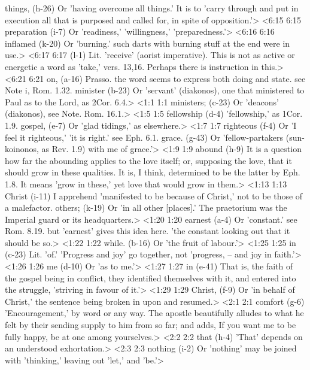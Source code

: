   things, (h-26)  Or 'having overcome all things.' It is to 'carry through and  put in execution all that is purposed and called for, in spite  of opposition.'>
<6:15 6:15  preparation (i-7)  Or 'readiness,' 'willingness,' 'preparedness.'>
<6:16 6:16  inflamed (k-20)  Or 'burning.' such darts with burning stuff at the end were  in use.>
<6:17 6:17   (l-1)  Lit. 'receive' (aorist imperative). This is not as active or  energetic a word as 'take,' vers. 13,16. Perhaps there is  instruction in this.>
<6:21 6:21  on, (a-16)  Prasso. the word seems to express both doing and state. see  Note i, Rom. 1.32.
  minister (b-23)  Or 'servant' (diakonos), one that ministered to Paul as to  the Lord, as 2Cor. 6.4.>
<1:1 1:1  ministers; (c-23)  Or 'deacons' (diakonos), see Note. Rom. 16.1.>
<1:5 1:5  fellowship (d-4)  'fellowship,' as 1Cor. 1.9.
  gospel, (e-7)  Or 'glad tidings,' as elsewhere.>
<1:7 1:7  righteous (f-4)  Or 'I feel it righteous,' 'it is right.' see Eph. 6.1.
  grace. (g-43)  Or 'fellow-partakers (sun-koinonos, as Rev. 1.9) with me of  grace.'>
<1:9 1:9  abound (h-9)  It is a question how far the abounding applies to the love  itself; or, supposing the love, that it should grow in these  qualities. It is, I think, determined to be the latter by Eph. 1.8. It means 'grow in these,' yet love that would grow in  them.>
<1:13 1:13  Christ (i-11)  I apprehend 'manifested to be because of Christ,' not to be  those of a malefactor.
  others; (k-19)  Or 'in all other [places].' The praetorium was the Imperial  guard or its headquarters.>
<1:20 1:20  earnest (a-4)  Or 'constant.' see Rom. 8.19. but 'earnest' gives this idea  here. 'the constant looking out that it should be so.>
<1:22 1:22  while. (b-16)  Or 'the fruit of labour.'>
<1:25 1:25  in (c-23)  Lit. 'of.' 'Progress and joy' go together, not 'progress, --  and joy in faith.'>
<1:26 1:26  me (d-10)  Or 'as to me.'>
<1:27 1:27  in (e-41)  That is, the faith of the gospel being in conflict, they  identified themselves with it, and entered into the struggle,  'striving in favour of it.'>
<1:29 1:29  Christ, (f-9)  Or 'in behalf of Christ,' the sentence being broken in upon  and resumed.>
<2:1 2:1  comfort (g-6)  'Encouragement,' by word or any way. The apostle beautifully  alludes to what he felt by their sending supply to him from so  far; and adds, If you want me to be fully happy, be at one  among yourselves.>
<2:2 2:2  that (h-4)  'That' depends on an understood exhortation.>
<2:3 2:3  nothing (i-2)  Or 'nothing' may be joined with 'thinking,' leaving out  'let,' and 'be.'>
